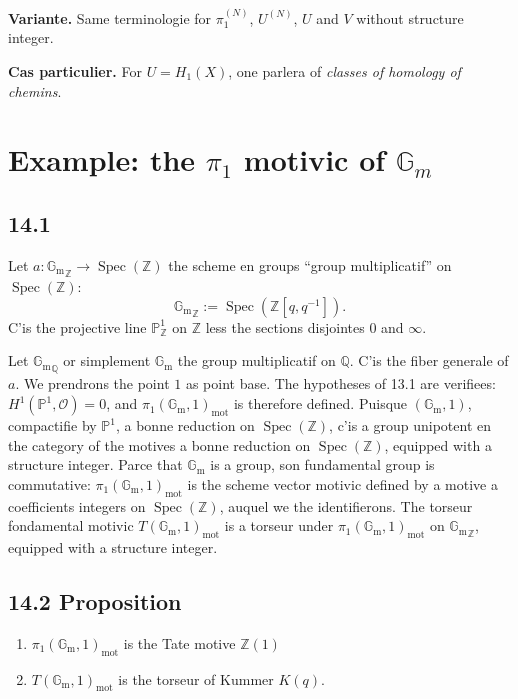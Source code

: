 \documentclass[12pt,a4paper]{article}
\theoremstyle{plain}
\theoremstyle{definition}
\theoremstyle{remark}
\DeclareMathOperator{\Spec}{Spec}
\newcommand*{\Gm}{\mathbb{G}_\mathrm{m}}
\newcommand{\cO}{\mathcal{O}}
\newcommand{\bZ}{\mathbb{Z}}
\newcommand{\bQ}{\mathbb{Q}}
\newcommand{\bP}{\mathbb{P}}
\newcommand{\mot}{\mathrm{mot}}
\begin{document}
\textbf{Variante.} Same terminologie for $\pi_1^{(N)}$, $U^{(N)}$, $U$ and $V$ without structure integer.

\textbf{Cas particulier.} For $U = H_1(X)$, one parlera of \emph{classes of homology of chemins}.


\section{Example: the $\pi_1$ motivic of $\mathbb{G}_m$}\label{sec:14}

\subsection*{14.1}

Let $a : {\Gm}_{\bZ} \to \Spec(\bZ)$ the scheme en groups ``group multiplicatif'' on $\Spec(\bZ)$:
\[
{\Gm}_{\bZ} := \Spec(\bZ[q, q^{-1}]).
\]
C'is the projective line $\bP^1_{\bZ}$ on $\bZ$ less the sections disjointes $0$ and $\infty$.

Let ${\Gm}_{\bQ}$ or simplement $\Gm$ the group multiplicatif on $\bQ$. C'is the fiber generale of $a$. We prendrons the point $1$ as point base. The hypotheses of 13.1 are verifiees: $H^1(\bP^1, \cO) = 0$, and $\pi_1(\Gm, 1)_{\mot}$ is therefore defined. Puisque $(\Gm, 1)$, compactifie by $\bP^1$, a bonne reduction on $\Spec(\bZ)$, c'is a group unipotent en the category of the motives a bonne reduction on $\Spec(\bZ)$, equipped with a structure integer. Parce that $\Gm$ is a group, son fundamental group is commutative: $\pi_1(\Gm, 1)_{\mot}$ is the scheme vector motivic defined by a motive a coefficients integers on $\Spec(\bZ)$, auquel we the identifierons. The torseur fondamental motivic $T(\Gm, 1)_{\mot}$ is a torseur under $\pi_1(\Gm, 1)_{\mot}$ on ${\Gm}_{\bZ}$, equipped with a structure integer.

\subsection*{14.2 Proposition}
\begin{enumerate}[label=(\roman*), nosep]
\item $\pi_1(\Gm, 1)_{\mot}$ is the Tate motive $\bZ(1)$
\item $T(\Gm, 1)_{\mot}$ is the torseur of Kummer $K(q)$.
\end{enumerate}
\end{document}
